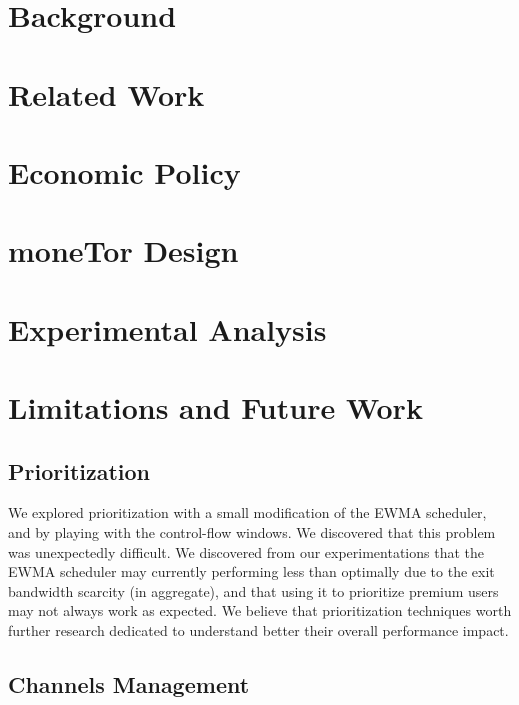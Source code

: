 \documentclass[sigconf, anonymous]{acmart}
\begin{document}
\section{Background}
\label{sec:background}


\section{Related Work}
\label{sec:related_work}


\section{Economic Policy}
\label{sec:tor_incentives}


\section{moneTor Design}
\label{sec:design}


\section{Experimental Analysis}
\label{sec:analysis}


\section{Limitations and Future Work}
\label{sec:limitations_futurework}
\subsection{Prioritization}

We explored prioritization with a small modification of the EWMA scheduler, and by playing with the control-flow windows. We discovered that this problem was unexpectedly difficult. We discovered from our experimentations that the EWMA scheduler may currently performing less than optimally due to the exit bandwidth scarcity (in aggregate), and that using it to prioritize premium users may not always work as expected. We believe that prioritization techniques worth further research dedicated to understand better their overall performance impact.

\subsection{Channels Management}
\end{document}
